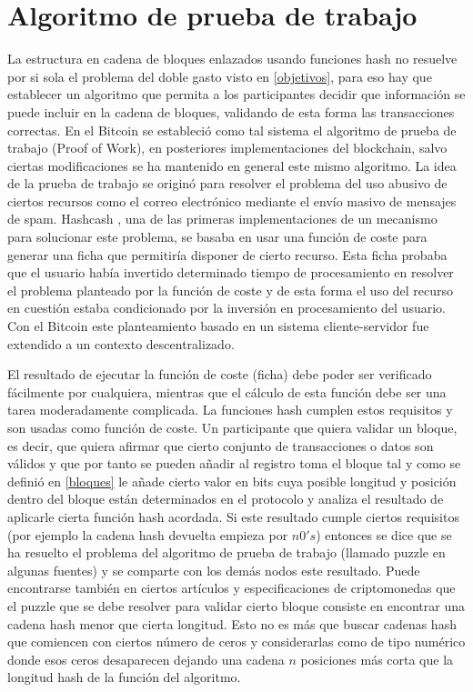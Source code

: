 \section{Algoritmo de prueba de trabajo}\label{chap3:pow}
La estructura en cadena de bloques enlazados usando funciones hash no resuelve por si sola el problema del doble gasto visto en \ref{objetivos}, para eso hay que establecer un algoritmo que permita a los participantes decidir que información se puede incluir en la cadena de bloques, validando de esta forma las transacciones correctas. En el Bitcoin se estableció como tal sistema el algoritmo de prueba de trabajo (Proof of Work), en posteriores implementaciones del blockchain, salvo ciertas modificaciones se ha mantenido en general este mismo algoritmo. La idea de la prueba de trabajo se originó para resolver el problema del uso abusivo de ciertos recursos como el correo electrónico mediante el envío masivo de mensajes de spam. Hashcash \citep{hashcash}, una de las primeras implementaciones de un mecanismo para solucionar este problema, se basaba en usar una función de coste para generar una ficha que permitiría disponer de cierto recurso. Esta ficha probaba que el usuario había invertido determinado tiempo de procesamiento en resolver el problema planteado por la función de coste y de esta forma el uso del recurso en cuestión estaba condicionado por la inversión en procesamiento del usuario. Con el Bitcoin este planteamiento basado en un sistema cliente-servidor fue extendido a un contexto descentralizado.

El resultado de ejecutar la función de coste (ficha) debe poder ser verificado fácilmente por cualquiera, mientras que el cálculo de esta función debe ser una tarea moderadamente complicada. La funciones hash cumplen estos requisitos y son usadas como función de coste. Un participante que quiera validar un bloque, es decir, que quiera afirmar que cierto conjunto de transacciones o datos son válidos y que por tanto se pueden añadir al registro toma el bloque tal y como se definió en \ref{bloques} le añade cierto valor en bits cuya posible longitud y posición dentro del bloque están determinados en el protocolo y analiza el resultado de aplicarle cierta función hash acordada. Si este resultado cumple ciertos requisitos (por ejemplo la cadena hash devuelta empieza por $n 0's$) entonces se dice que se ha resuelto el problema del algoritmo de prueba de trabajo (llamado puzzle en algunas fuentes) y se comparte con los demás nodos este resultado. Puede encontrarse también en ciertos artículos y especificaciones de criptomonedas que el puzzle que se debe resolver para validar cierto bloque consiste en encontrar una cadena hash menor que cierta longitud. Esto no es más que buscar cadenas hash que comiencen con ciertos número de ceros y considerarlas como de tipo numérico donde esos ceros desaparecen dejando una cadena $n$ posiciones más corta que la longitud hash de la función del algoritmo. 

